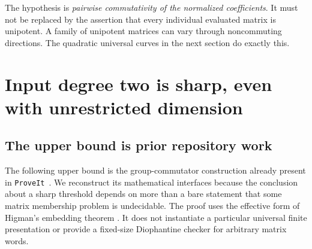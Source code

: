 \documentclass[11pt,letterpaper]{article}
\theoremstyle{definition}
\theoremstyle{remark}
\newcommand{\repo}{\texttt{ProveIt}}
\begin{document}
The hypothesis is \emph{pairwise commutativity of the normalized coefficients}. It must not be replaced by the assertion that every individual evaluated matrix is unipotent. A family of unipotent matrices can vary through noncommuting directions. The quadratic universal curves in the next section do exactly this.

\section{Input degree two is sharp, even with unrestricted dimension}\label{gts:ai:sec:degree}
\subsection{The upper bound is prior repository work}
The following upper bound is the group-commutator construction already present in \repo\ \cite{ai-repoquadratic}. We reconstruct its mathematical interfaces because the conclusion about a sharp threshold depends on more than a bare statement that some matrix membership problem is undecidable. The proof uses the effective form of Higman's embedding theorem \cite{ai-higman,ai-mikaelian}. It does not instantiate a particular universal finite presentation or provide a fixed-size Diophantine checker for arbitrary matrix words.
\end{document}

